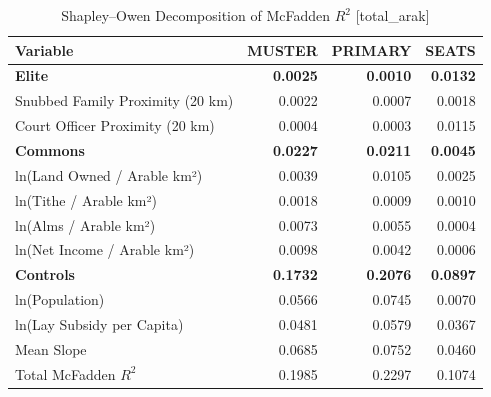 \begin{table}[H]
\centering
\caption{Shapley--Owen Decomposition of McFadden $R^2$ [total_arak]}
\label{tab:shapley_owen_total_arak}
\begin{tabular}{lrrr}
\hline\hline
Variable & MUSTER & PRIMARY & SEATS \\
\hline
\textbf{Elite} & \textbf{0.0025} & \textbf{0.0010} & \textbf{0.0132} \\
\quad Snubbed Family Proximity (20 km) & 0.0022 & 0.0007 & 0.0018 \\
\quad Court Officer Proximity (20 km) & 0.0004 & 0.0003 & 0.0115 \\
\textbf{Commons} & \textbf{0.0227} & \textbf{0.0211} & \textbf{0.0045} \\
\quad ln(Land Owned / Arable km²) & 0.0039 & 0.0105 & 0.0025 \\
\quad ln(Tithe / Arable km²) & 0.0018 & 0.0009 & 0.0010 \\
\quad ln(Alms / Arable km²) & 0.0073 & 0.0055 & 0.0004 \\
\quad ln(Net Income / Arable km²) & 0.0098 & 0.0042 & 0.0006 \\
\textbf{Controls} & \textbf{0.1732} & \textbf{0.2076} & \textbf{0.0897} \\
\quad ln(Population) & 0.0566 & 0.0745 & 0.0070 \\
\quad ln(Lay Subsidy per Capita) & 0.0481 & 0.0579 & 0.0367 \\
\quad Mean Slope & 0.0685 & 0.0752 & 0.0460 \\
\hline
Total McFadden $R^2$ & 0.1985 & 0.2297 & 0.1074 \\
\hline\hline
\end{tabular}
\end{table}
